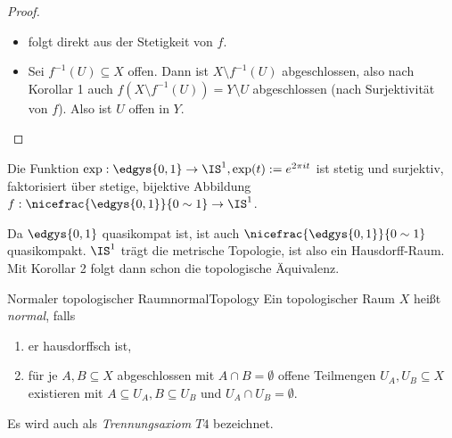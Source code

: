 \documentclass[language=ngerman]{TemplateLecture} %
\begin{document}
\begin{proof}\leavevmode
    \begin{itemize}
        \item[\enquote{$\Rightarrow$}] folgt direkt aus der Stetigkeit von $f$.
        \item[\enquote{$\Leftarrow$}] Sei $f^{-1}(U) \subseteq X$ offen. Dann ist $X \setminus f^{-1}(U)$ abgeschlossen, also nach Korollar 1 auch $f(X \setminus f^{-1}(U)) = Y \setminus U$ abgeschlossen (nach Surjektivität von $f$). Also ist $U$ offen in $Y$.
    \end{itemize}
\end{proof}

\begin{example}[zu Korollar 2]
    Die Funktion $\exp: \edgys{0,1} \to \IS^1, \exp(t) := e^{2\pi i t}$ ist stetig und surjektiv, faktorisiert über stetige, bijektive Abbildung $f: \nicefrac{\edgys{0,1}}{0 \sim 1} \to \IS^1$. 

    Da $\edgys{0,1}$ quasikompat ist, ist auch $\nicefrac{\edgys{0,1}}{0 \sim 1}$ quasikompakt. $\IS^1$ trägt die metrische Topologie, ist also ein Hausdorff-Raum. Mit Korollar 2 folgt dann schon die topologische Äquivalenz.
\end{example}

\begin{defi}{Normaler topologischer Raum}{normalTopology}
    Ein topologischer Raum $X$ heißt \emph{normal}, falls
    \begin{enumerate}[$(i)$]
        \item er hausdorffsch ist,
        \item für je $A, B \subseteq X$ abgeschlossen mit $A \cap B = \emptyset$ offene Teilmengen $U_A, U_B \subseteq X$ existieren mit $A \subseteq U_A, B \subseteq U_B$ und $U_A \cap U_B = \emptyset$.
    \end{enumerate}
    Es wird auch als \emph{Trennungsaxiom $T4$} bezeichnet.
\end{defi}
\end{document}
